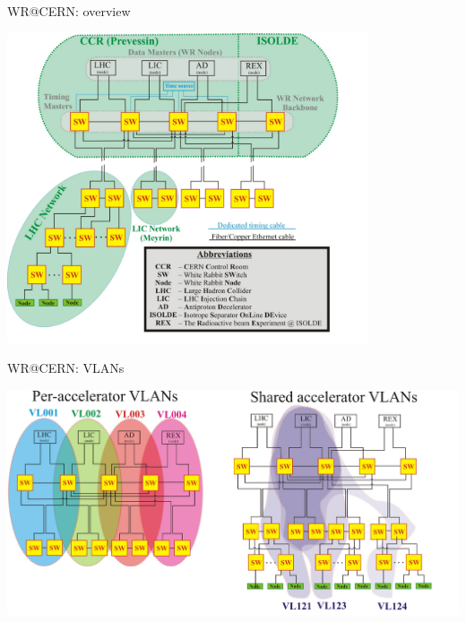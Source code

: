 \documentclass[compress,red]{beamer}
\begin{document}
\subsection{}
\begin{frame}{WR@CERN: overview}


      \begin{center}
	\includegraphics[width=0.8\textwidth]{applications/CERN/NT-overview_legend.pdf}
      \end{center}  

\end{frame}
\begin{frame}{WR@CERN: VLANs}

      \begin{center}
	\includegraphics[width=1.1\textwidth]{applications/CERN/NT-VLANs_v2.pdf}
      \end{center}  

\end{frame}
\end{document}
